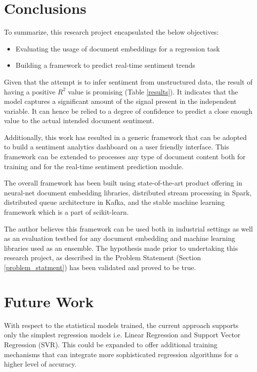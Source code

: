 \documentclass[conference]{IEEEtran}
\begin{document}
\vspace{5mm}

\section{Conclusions}
    To summarize, this research project encapsulated the below objectives:
    \begin{itemize}
        \item Evaluating the usage of document embeddings for a regression task
        \item Building a framework to predict real-time sentiment trends
    \end{itemize}

    Given that the attempt is to infer sentiment from unstructured data, the result of having a positive $R^2$ value is promising (Table \ref{results}).
    It indicates that the model captures a significant amount of the signal present in the independent variable.
    It can hence be relied to a degree of confidence to predict a close enough value to the actual intended document sentiment.

    Additionally, this work has resulted in a generic framework that can be adopted to build a sentiment analytics dashboard on a user friendly interface. 
    This framework can be extended to processes any type of document content both for training and for the real-time sentiment prediction module.

    The overall framework has been built using state-of-the-art product offering in neural-net document embedding libraries, distributed stream processing in Spark, distributed queue architecture in Kafka, and the stable machine learning framework which is a part of scikit-learn. 

    The author believes this framework can be used both in industrial settings as well as an evaluation testbed for any document embedding and machine learning libraries used as an ensemble. The hypothesis made prior to undertaking this research project, as described in the Problem Statement (Section \ref{problem_statment}) has been validated and proved to be true.

\vspace{5mm}

\section{Future Work}
    With respect to the statistical models trained, the current approach supports only the simplest regression models i.e. Linear Regression and Support Vector Regression (SVR). 
    This could be expanded to offer additional training mechanisms that can integrate more sophisticated regression algorithms for a higher level of accuracy.
     
\end{document}
